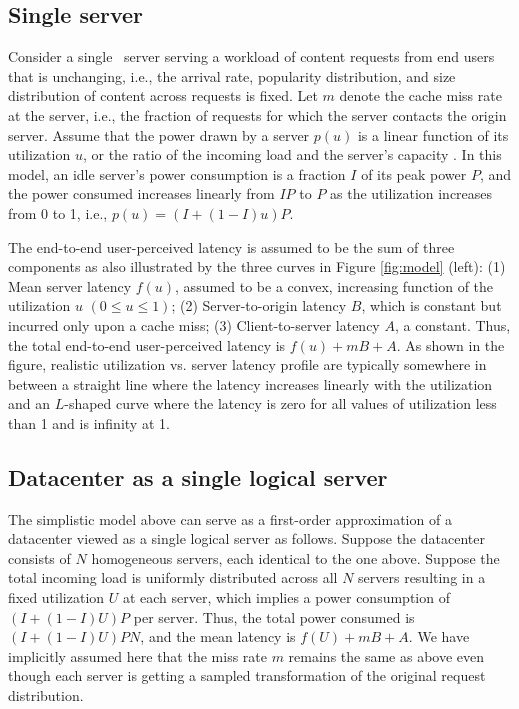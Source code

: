 \subsection{Single server}
\label{sec:singleserver}
Consider a single \cdc\ server serving a workload of content requests from end users that is unchanging, i.e., the arrival rate, popularity distribution, and size distribution of content across requests is fixed. Let $m$ denote the cache miss rate at the server, i.e., the fraction of requests for which the server contacts the origin server. Assume that the power drawn by a server $p(u)$ is a linear function of its utilization $u$, or the ratio of the incoming load and the server's capacity \cite{mathew12}. In this model, an idle server's power consumption is a fraction $I$ of its peak power $P$, and the power consumed increases linearly from $IP$ to $P$ as the utilization increases from 0 to 1, i.e., $p(u) = (I + (1-I)u)P$.

The end-to-end user-perceived latency is assumed to be the sum of three components as also illustrated by the three curves in Figure \ref{fig:model} (left): (1) Mean server latency $f(u)$, assumed to be a convex, increasing function of the utilization $u$ $(0\leq u\leq1)$; (2) Server-to-origin latency $B$, which is constant but incurred only upon a cache miss; (3) Client-to-server latency $A$, a constant. Thus, the total end-to-end user-perceived latency is $f(u) + mB + A$. As shown in the figure, realistic utilization vs. server latency profile are typically somewhere in between a straight line where the latency increases linearly with the utilization and an $L$-shaped curve where the latency is zero for all values of utilization less than 1 and is infinity at 1.

\subsection{Datacenter as a single logical server}
\label{sec:multiserver}

The simplistic model above can serve as a first-order approximation of a datacenter viewed as a single logical server as follows. Suppose the datacenter consists of $N$ homogeneous servers, each identical to the one above. Suppose the total incoming load is uniformly distributed across all $N$ servers resulting in a fixed utilization $U$ at each server, which implies a power consumption of $(I+(1-I)U)P$ per server. Thus, the total power consumed is $(I+(1-I)U)PN$, and the mean latency is $f(U) + mB + A$. We have implicitly assumed here that the miss rate $m$ remains the same as above even though each server is getting a sampled transformation of the original request distribution.

